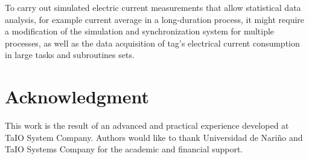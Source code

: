 \documentclass[journal]{IEEEtran}	%
\begin{document}
To carry out simulated electric current measurements that allow statistical data analysis, for example current average in a long-duration process, it might require a modification of the simulation and synchronization system for multiple processes, as well as the data acquisition of tag's electrical current consumption in large tasks and subroutines sets.


\section*{Acknowledgment}


This work is the result of an advanced and practical experience developed at TaIO System Company. Authors would like to thank Universidad de Nariño and TaIO Systems Company for the academic and financial support.


\end{document}
